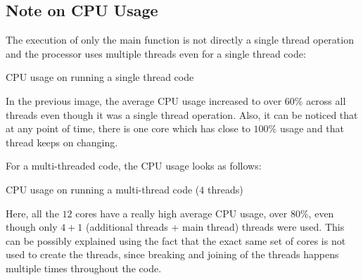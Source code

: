 \documentclass{article}
\begin{document}
\subsection{Note on CPU Usage}
The execution of only the main function is not directly a single thread operation and the processor uses multiple threads even for a single thread code:
\begin{center}
    CPU usage on running a single thread code
\end{center}
In the previous image, the average CPU usage increased to over $60\%$ across all threads even though it was a single thread operation. Also, it can be noticed that at any point of time, there is one core which has close to $100\%$ usage and that thread keeps on changing.\par
For a multi-threaded code, the CPU usage looks as follows:
\begin{center}
    CPU usage on running a multi-thread code ($4$ threads)
\end{center}
Here, all the $12$ cores have a really high average CPU usage, over $80\%$, even though only $4+1$ (additional threads + main thread) threads were used. This can be possibly explained using the fact that the exact same set of cores is not used to create the threads, since breaking and joining of the threads happens multiple times throughout the code.

\end{document}
